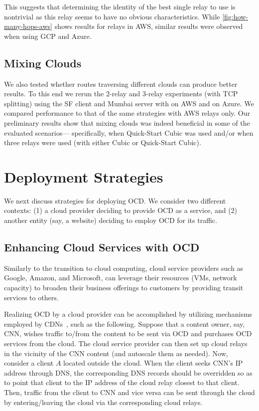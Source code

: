 \documentclass[sigconf,usenames,dvipsnames,geometry]{acmart}
\begin{document}
This suggests that determining the identity of the best single relay to use is nontrivial as this relay seems to have no obvious characteristics. While \autoref{fig:how-many-hops-aws} shows results for relays in AWS, similar results were observed when using GCP and Azure.


\subsection{Mixing Clouds}

We also tested whether routes traversing different clouds can produce better results. To this end we rerun the 2-relay and 3-relay experiments (with TCP splitting) using the SF client and Mumbai server with \rc on AWS and \rs on Azure. We compared performance to that of the same strategies with AWS relays only. Our preliminary results show that mixing clouds was indeed beneficial in some of the evaluated scenarios--- specifically, when Quick-Start Cubic was used and/or when three relays were used (with either Cubic or Quick-Start Cubic). 

\section{Deployment Strategies}

We next discuss strategies for deploying OCD. We consider two different contexts: (1) a cloud provider deciding to provide OCD as a service, and (2) another entity (say, a website) deciding to employ OCD for its traffic.

\subsection{Enhancing Cloud Services with OCD}

Similarly to the transition to cloud computing, cloud service providers such as Google, Amazon, and Microsoft, can leverage their resources (VMs, network capacity) to broaden their business offerings to customers by providing transit services to others.

Realizing OCD by a cloud provider can be accomplished by utilizing mechanisms employed by CDNs~\cite{x,y,z}, such as the following. Suppose that a content owner, say, CNN, wishes traffic to/from the content to be sent via OCD and purchases OCD services from the cloud. The cloud service provider can then set up cloud relays in the vicinity of the CNN content (and autoscale them as needed). Now, consider a client $A$ located outside the cloud. When the client seeks CNN's IP address through DNS, the corresponding DNS records should be overridden so as to point that client to the IP address of the cloud relay closest to that client. Then, traffic from the client to CNN and vice versa can be sent through the cloud by entering/leaving the cloud via the corresponding cloud relays.
\end{document}
